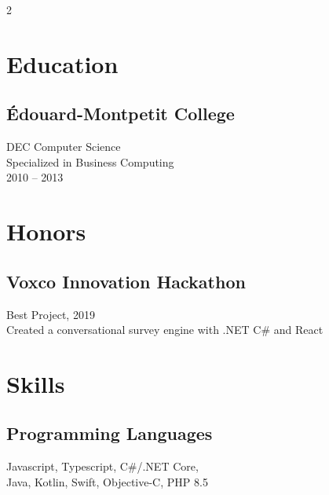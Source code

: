 \documentclass{article}
\begin{document}
\setlength{\columnsep}{4em}
\setlength{\columnseprule}{0.4pt}
\begin{paracol}{2}
  \begin{leftcolumn}
    \vspace{-2.5em}
    \section{Education}

    \subsection{Édouard-Montpetit College}
    DEC Computer Science \\
    Specialized in Business Computing \\
    2010 -- 2013

    \section{Honors}

    \subsection{Voxco Innovation Hackathon}
    \faAward\hspace{0.5em}Best Project, 2019 \\
    Created a conversational survey engine with .NET C\# and React \\

    \section{Skills}

    \subsection{Programming Languages}
    Javascript, Typescript, C\#/.NET Core,\\
    Java, Kotlin, Swift, Objective-C, PHP 8.5

    \vspace{0.5em}


\end{leftcolumn}
\end{paracol}
\end{document}

